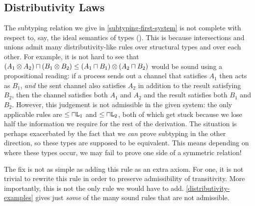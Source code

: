 
\subsection{Distributivity Laws}
\label{distributivity}

The subtyping relation we give in \cref{subtyping-first-system} is not complete with respect to, say, the ideal semantics of types (\cite{VouillonM04, Damm94}). This is because intersections and unions admit many distributivity-like rules over structural types and over each other. For example, it is not hard to see that $(A_1 \otimes A_2) \mathbin{\sqcap} (B_1 \otimes B_2) \le (A_1 \mathbin{\sqcap} B_1) \otimes (A_2 \mathbin{\sqcap} B_2)$ would be sound using a propositional reading: if a process sends out a channel that satisfies $A_1$ then acts as $B_1$, \emph{and} the sent channel also satisfies $A_2$ in addition to the result satisfying $B_2$, then the channel satisfies both $A_1$ and $A_2$ and the result satisfies both $B_1$ and $B_2$. However, this judgement is not admissible in the given system: the only applicable rules are $\le{\mathbin{\sqcap}\texttt{L}_1}$ and $\le{\mathbin{\sqcap}\texttt{L}_2}$, both of which get stuck because we lose half the information we require for the rest of the derivation. The situation is perhaps exacerbated by the fact that we \emph{can} prove subtyping in the other direction, so these types are supposed to be equivalent. This means depending on where these types occur, we may fail to prove one side of a symmetric relation!

The fix is not as simple as adding this rule as an extra axiom. For one, it is not trivial to rewrite this rule in order to preserve admissibility of transitivity. More importantly, this is not the only rule we would have to add. \cref{distributivity-examples} gives just \emph{some} of the many sound rules that are not admissible.


